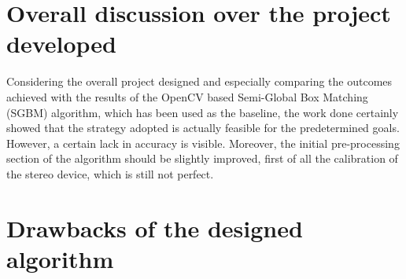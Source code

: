 \section{Overall discussion over the project developed}
\label{section:overall-discussion}

Considering the overall project designed and especially comparing the outcomes achieved with the results of the OpenCV based Semi-Global Box Matching (SGBM) algorithm, which has been used as the baseline, the work done certainly showed that the strategy adopted is actually feasible for the predetermined goals.\\
However, a certain lack in accuracy is visible.
Moreover, the initial pre-processing section of the algorithm should be slightly improved, first of all the calibration of the stereo device, which is still not perfect. 



\section{Drawbacks of the designed algorithm}
\label{section:algorithm-drawbacks}

